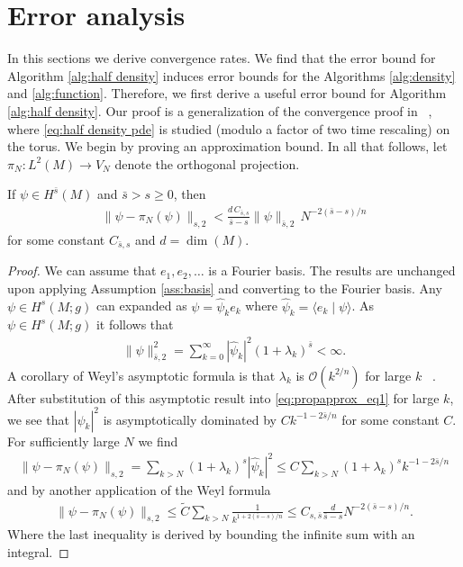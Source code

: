 \documentclass[final,leqno]{siamart}
\begin{document}
\section{Error analysis} \label{sec:analysis}

In this sections we derive convergence rates.
We find that the error bound for Algorithm \ref{alg:half density} induces error bounds for the Algorithms \ref{alg:density} and \ref{alg:function}.
Therefore, we first derive a useful error bound for Algorithm \ref{alg:half density}.
Our proof is a generalization of the convergence proof in ~\cite{Pasciak1980}, where \eqref{eq:half density pde} is studied (modulo a factor of two time rescaling) on the torus.
We begin by proving an approximation bound.
In all that follows, let $\pi_{N}: L^{2}(M) \to V_{N}$ denote the orthogonal projection.

\begin{proposition} \label{prop:approximation}
	If $\psi \in H^{\bar{s}}(M)$ and $\bar{s} > s \geq 0$,
	then
	\begin{align*}
		\| \psi - \pi_{N}(\psi) \|_{s,2} <  \frac{d \, C_{\bar{s},s} }{ \bar{s}-s} \| \psi \|_{\bar{s} , 2} \, N^{-2(\bar{s}-s)/n}
	\end{align*}
	for some constant $C_{\bar{s},s}$ and $d = \dim(M)$.
\end{proposition}
\begin{proof}
	We can assume that $e_{1},e_{2},\dots$ is a Fourier basis.
	The results are unchanged upon applying Assumption \ref{ass:basis} and converting to the Fourier basis.
	Any $\psi \in H^{s}(M;g)$ can expanded as $\psi = \hat{\psi}_{k} e_{k}$ where $\hat{\psi}_{k} = \langle e_{k} \mid \psi \rangle$.
	As $\psi \in H^{s}(M;g)$ it follows that
	\begin{align}
		\| \psi \|^{2}_{\bar{s},2} = \sum_{k=0}^{\infty} \left| \hat{\psi}_{k} \right|^{2} (1+\lambda_{k})^{\bar{s}} < \infty.
		\label{eq:propapprox_eq1}
	\end{align}
	A corollary of Weyl's asymptotic formula is that $\lambda_{k}$ is $\mathcal{O}( k^{2/n})$ for large $k$ ~\cite[page 155]{Chavel1984}.
	After substitution of this asymptotic result into \eqref{eq:propapprox_eq1} for large $k$, we see that $|\hat{\psi}_{k}|^{2}$ is asymptotically dominated by  $C k^{-1- 2\bar{s}/n}$ for some constant $C$.
	For sufficiently large $N$ we find
	\begin{align*}
		\| \psi - \pi_{N}(\psi) \|_{s,2} = \sum_{k>N} (1+\lambda_{k})^{s} |\hat{\psi}_{k}|^{2} \leq C \sum_{k>N} (1+\lambda_{k})^{s} k^{-1- 2\bar{s}/n}
	\end{align*}
	and by another application of the Weyl formula
	\begin{align*}
		\| \psi - \pi_{N}(\psi) \|_{s,2} \leq \tilde{C} \sum_{k>N} \frac{1}{k^{1+2(\bar{s}-s)/n}} \leq C_{s,\bar{s}}  \frac{d }{ \bar{s}-s} N^{-2(\bar{s}-s)/n}.
	\end{align*}
	Where the last inequality is derived by bounding the infinite sum with an integral.
\end{proof}
\end{document}
